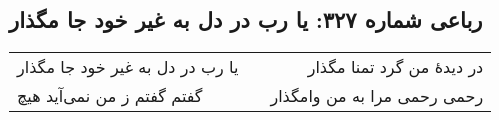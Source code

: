 \begin{center}
\section*{رباعی شماره ۳۲۷: یا رب در دل به غیر خود جا مگذار}
\label{sec:sh327}
\begin{longtable}{l p{0.5cm} r}
یا رب در دل به غیر خود جا مگذار
&&
در دیدهٔ من گرد تمنا مگذار
\\
گفتم گفتم ز من نمی‌آید هیچ
&&
رحمی رحمی مرا به من وامگذار
\\
\end{longtable}
\end{center}
